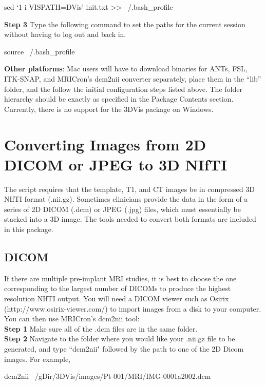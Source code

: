 \documentclass[12pt]{article}
\begin{document}
\begin{verb}
  sed `1 i VISPATH=\mnt\local\gdrive\public\3DVis' init.txt >> ~/.bash_profile
\end{verb}

\textbf{Step 3} Type the following command to set the paths for the current session without having to log out and back in. 

\begin{verb}
  source ~/.bash_profile
\end{verb}

\textbf{Other platforms}: Mac users will have to download binaries for ANTs, FSL, ITK-SNAP, and MRICron's dcm2nii converter separately, place them in the ``lib'' folder, and the follow the initial configuration steps listed above.  The folder hierarchy should be exactly as specified in the Package Contents section. Currently, there is no support for the 3DVis package on Windows.


\section{Converting Images from 2D DICOM or JPEG  to 3D NIfTI}
The script requires that the template, T1, and CT images be in compressed 3D NIfTI format (.nii.gz). Sometimes clinicians provide the data in the form of a series of 2D DICOM (.dcm) or JPEG (.jpg) files, which must essentially be stacked into a 3D image. The tools needed to convert both formats are included in this package.

\subsection*{DICOM}
If there are multiple pre-implant MRI studies, it is best to choose the one corresponding to the largest number of DICOMs to produce the highest resolution NIfTI output. You will need a DICOM viewer such as Osirix (http://www.osirix-viewer.com/) to import images from a disk to your computer. You can then use MRICron's dcm2nii tool: \\
\textbf{Step 1} Make sure all of the .dcm files are in the same folder. \\
\textbf{Step 2} Navigate to the folder where you would like your .nii.gz file to be generated, and type ``dcm2nii" followed by the path to one of the 2D Dicom images. For example, 

\begin{verb}
  dcm2nii ~/gDir/3DVis/images/Pt-001/MRI/IMG-0001a2002.dcm 
\end{verb}
\end{document}
